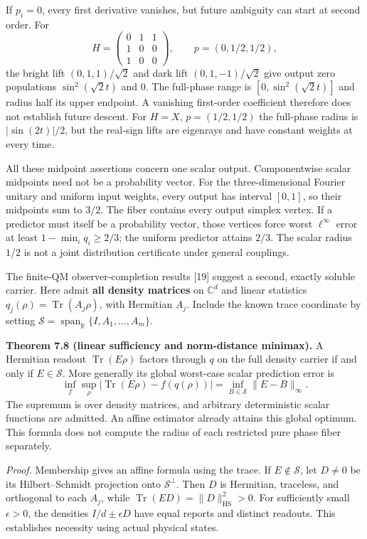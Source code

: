 \documentclass[
  11pt,
]{article}
\begin{document}
If \(p_i=0\), every first derivative vanishes, but future ambiguity can start at
second order. For
\[
H=\begin{pmatrix}0&1&1\\1&0&0\\1&0&0\end{pmatrix},\qquad
p=(0,1/2,1/2),
\]
the bright lift \((0,1,1)/\sqrt2\) and dark lift \((0,1,-1)/\sqrt2\) give output
zero populations \(\sin^2(\sqrt2t)\) and \(0\). The full-phase range is
\([0,\sin^2(\sqrt2t)]\) and radius half its upper endpoint. A vanishing
first-order coefficient therefore does not establish future descent. For
\(H=X\), \(p=(1/2,1/2)\) the full-phase radius is \(|\sin(2t)|/2\), but the
real-sign lifts are eigenrays and have constant weights at every time.

All these midpoint assertions concern one scalar output. Componentwise scalar
midpoints need not be a probability vector. For the three-dimensional Fourier
unitary and uniform input weights, every output has interval \([0,1]\), so their
midpoints sum to \(3/2\). The fiber contains every output simplex vertex. If a
predictor must itself be a probability vector, those vertices force worst
\(\ell^\infty\) error at least \(1-\min_iq_i\ge2/3\); the uniform predictor
attains \(2/3\). The scalar radius \(1/2\) is not a joint distribution certificate under general couplings.

The finite-QM observer-completion results {[}19{]} suggest a second, exactly
soluble carrier. Here admit \textbf{all density matrices} on \(\mathbb C^d\) and
linear statistics \(q_j(\rho)=\operatorname{Tr}(A_j\rho)\), with Hermitian
\(A_j\). Include the known trace coordinate by setting
\(\mathcal S=\operatorname{span}_{\mathbb R}\{I,A_1,\ldots,A_m\}\).

\textbf{Theorem 7.8 (linear sufficiency and norm-distance minimax).} A Hermitian
readout \(\operatorname{Tr}(E\rho)\) factors through \(q\) on the full density
carrier if and only if \(E\in\mathcal S\). More generally its global worst-case
scalar prediction error is
\[
\inf_f\sup_{\rho}\bigl|\operatorname{Tr}(E\rho)-f(q(\rho))\bigr|
                 =\inf_{B\in\mathcal S}\lVert E-B\rVert_\infty.
\]
The supremum is over density matrices, and arbitrary deterministic scalar
functions are admitted. An affine estimator already attains this global
optimum. This formula does not compute the radius of each restricted pure
phase fiber separately.

\emph{Proof.} Membership gives an affine formula using the trace. If \(E\notin \mathcal S\),
let \(D\ne0\) be its Hilbert--Schmidt projection onto
\(\mathcal S^\perp\). Then \(D\) is Hermitian, traceless, and orthogonal to each
\(A_j\), while \(\operatorname{Tr}(ED)=\lVert D\rVert_{\mathrm{HS}}^2>0\).
For sufficiently small \(\epsilon>0\), the densities \(I/d\pm\epsilon D\)
have equal reports and distinct readouts. This establishes necessity using actual
physical states.
\end{document}
